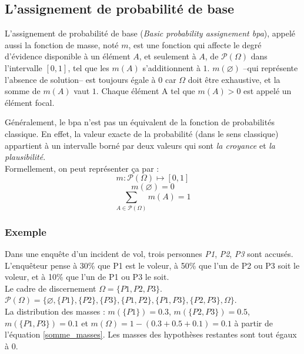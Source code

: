 \subsection{L’assignement de probabilité de base}

L’assignement de probabilité de base (\emph{Basic probability assignement bpa}),
appelé aussi la fonction de masse, noté $m$, est une fonction qui affecte le degré d’évidence disponible à
un élément $A$, et seulement à $A$, de $\mathcal{P}(\Omega)$ dans l’intervalle $[0,1]$, tel que
les $m(A)$ s’additionnent à $1$. $m(\varnothing)$ --qui représente l’absence de solution-- est
toujours égale à $0$ car $\Omega$ doit être exhaustive, et la somme de $m(A)$ vaut $1$. Chaque
élément A tel que $m(A) > 0$ est appelé un élément focal.

Généralement, le bpa n’est pas un équivalent de la fonction de probabilités classique. En effet,
la valeur exacte de la probabilité (dans le sens classique) appartient à un intervalle borné par
deux valeurs qui sont \emph{la croyance} et \emph{la plausibilité}.\\
Formellement, on peut représenter ça par :
\begin{equation}
m : \mathcal{P}(\Omega) \mapsto [0,1]
\end{equation}
\begin{equation}
m(\varnothing) = 0
\end{equation}
\begin{equation} \label{somme_masses}
\sum_{A \in \mathcal{P}(\Omega)} m(A) = 1
\end{equation}

\subsubsection{Exemple}
Dans une enquête d’un incident de vol, trois personnes \textit{P1}, \textit{P2}, \textit{P3}
sont accusés. L’enquêteur pense à 30\% que P1 est le voleur, à 50\% que l’un de P2 ou P3 soit
le voleur, et à 10\% que l’un de P1 ou P3 le soit.\\
Le cadre de discernement $\Omega = \{P1, P2, P3\}$.\\
$\mathcal{P}(\Omega) = \{\varnothing, \{P1\}, \{P2\}, \{P3\}, \{P1, P2\}, \{P1, P3\},
\{P2, P3\}, \Omega\}$.\\
La distribution des masses : $m(\{P1\}) = 0.3$, $m(\{P2, P3\})  = 0.5$,
$m(\{P1, P3\}) = 0.1$ et $m(\Omega) = 1 - (0.3+0.5+0.1) = 0.1$ à partir de l’équation
\ref{somme_masses}. Les masses des hypothèses restantes sont tout égaux à $0$.

